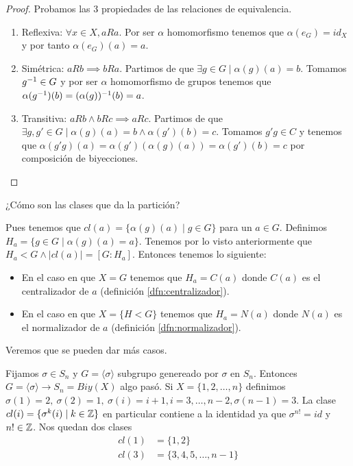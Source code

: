 \begin{proof}Probamos las 3 propiedades de las relaciones de equivalencia.
	\begin{enumerate}
		\item Reflexiva: $\forall x \in X, a R a$. Por ser $\alpha$ homomorfismo tenemos que $\alpha(e_G) = id_X$ y por tanto $\alpha(e_G)(a) = a$.
		\item Simétrica: $aRb \implies bRa$. Partimos de que $\exists g \in G \mid \alpha(g)(a) = b$. Tomamos $g^{-1} \in G$ y por ser $\alpha$ homomorfismo de grupos tenemos que $\alpha(g^{-1})(b) = (\alpha(g))^{-1}(b) = a$.
		\item Transitiva: $aRb \land bRc \implies aRc$. Partimos de que $\exists g, g' \in G \mid \alpha(g)(a) = b \land \alpha(g')(b) = c$. Tomamos $g'g \in C$ y tenemos que $\alpha(g'g)(a) = \alpha(g')(\alpha(g)(a)) = \alpha(g')(b) = c$ por composición de biyecciones.
	\end{enumerate}
\end{proof}

¿Cómo son las clases que da la partición?

Pues tenemos que $cl(a) = \{\alpha(g)(a) \mid g \in G\}$ para un $a \in G$. Definimos $H_a = \{g \in G \mid \alpha(g)(a) = a\}$. Tenemos por lo visto anteriormente que $H_a < G \land |cl(a)| = [G:H_a]$. Entonces tenemos lo siguiente:
\begin{itemize}
	\item En el caso en que $X = G$ tenemos que $H_a = C(a)$ donde $C(a)$ es el centralizador de $a$ (definición \ref{dfn:centralizador}).
	\item En el caso en que $X = \{H < G\}$ tenemos que $H_a = N(a)$ donde $N(a)$ es el normalizador de $a$ (definición \ref{dfn:normalizador}).
\end{itemize}
Veremos que se pueden dar más casos.

\begin{ej}
	Fijamos $\sigma \in S_n$ y $G = \langle \sigma \rangle$ subgrupo genereado por $\sigma$ en $S_n$. Entonces $G = \langle \sigma \rangle \to S_n = Biy(X)$ algo pasó. Si $X = \{1, 2, \dots, n\}$ definimos $\sigma(1) = 2,\ \sigma(2) = 1,\ \sigma(i) = i+1, i = 3,\dots, n-2,\sigma(n-1) = 3$. La clase $cl(i) = \{\sigma^k(i) \mid k \in \mathbb{Z}\}$ en particular contiene a la identidad ya que $\sigma^{n!} = id$ y $n! \in \mathbb{Z}$. Nos quedan dos clases
	\begin{align*}
	cl(1) &= \{1, 2\} \\
	cl(3) &= \{3, 4, 5, \dots, n - 1\}
	\end{align*}
\end{ej}

